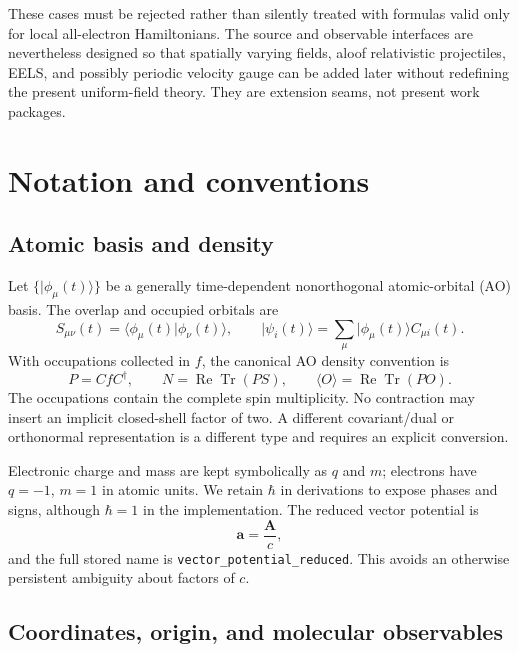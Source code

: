 \documentclass[11pt]{article}
\newcommand{\ReTr}{\operatorname{Re}\operatorname{Tr}}
\newcommand{\vect}[1]{\bm{#1}}
\newcommand{\code}[1]{\texttt{#1}}
\begin{document}
These cases must be rejected rather than silently treated with formulas valid
only for local all-electron Hamiltonians. The source and observable interfaces
are nevertheless designed so that spatially varying fields, aloof relativistic
projectiles, EELS, and possibly periodic velocity gauge can be added later
without redefining the present uniform-field theory. They are extension seams,
not present work packages.

\section{Notation and conventions}

\subsection{Atomic basis and density}

Let \(\{\lvert\phi_\mu(t)\rangle\}\) be a generally time-dependent
nonorthogonal atomic-orbital (AO) basis. The overlap and occupied orbitals are
\begin{equation}
 S_{\mu\nu}(t)=\langle\phi_\mu(t)\vert\phi_\nu(t)\rangle,
 \qquad
 \lvert\psi_i(t)\rangle
 =\sum_\mu\lvert\phi_\mu(t)\rangle C_{\mu i}(t).
\end{equation}
With occupations collected in \(f\), the canonical AO density convention is
\begin{equation}
 P=CfC^\dagger,\qquad
 N=\ReTr(PS),\qquad
 \langle O\rangle=\ReTr(PO).
 \label{eq:density-convention}
\end{equation}
The occupations contain the complete spin multiplicity. No contraction may
insert an implicit closed-shell factor of two. A different covariant/dual or
orthonormal representation is a different type and requires an explicit
conversion.

Electronic charge and mass are kept symbolically as \(q\) and \(m\);
electrons have \(q=-1\), \(m=1\) in atomic units. We retain \(\hbar\)
in derivations to expose phases and signs, although \(\hbar=1\) in the
implementation. The reduced vector potential is
\begin{equation}
 \vect a=\frac{\vect A}{c},
\end{equation}
and the full stored name is \code{vector\_potential\_reduced}. This avoids
an otherwise persistent ambiguity about factors of \(c\).

\subsection{Coordinates, origin, and molecular observables}
\end{document}
